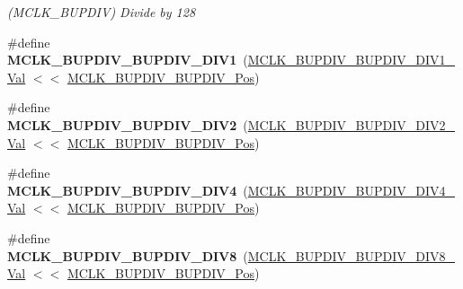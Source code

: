 \begin{DoxyCompactItemize}
\begin{DoxyCompactList}\small\item\em (M\+C\+L\+K\+\_\+\+B\+U\+P\+D\+I\+V) Divide by 128 \end{DoxyCompactList}\item 
\hypertarget{group___s_a_m_l21___m_c_l_k_ga4dd1bacc8eca76626ef8e592d1ac464b}{}\#define {\bfseries M\+C\+L\+K\+\_\+\+B\+U\+P\+D\+I\+V\+\_\+\+B\+U\+P\+D\+I\+V\+\_\+\+D\+I\+V1}~(\hyperlink{group___s_a_m_l21___m_c_l_k_ga671158df20fbfdcde67f602985780d65}{M\+C\+L\+K\+\_\+\+B\+U\+P\+D\+I\+V\+\_\+\+B\+U\+P\+D\+I\+V\+\_\+\+D\+I\+V1\+\_\+\+Val}   $<$$<$ \hyperlink{group___s_a_m_l21___m_c_l_k_ga990b49fd5adb7bbd8a9acf12cd483ae2}{M\+C\+L\+K\+\_\+\+B\+U\+P\+D\+I\+V\+\_\+\+B\+U\+P\+D\+I\+V\+\_\+\+Pos})\label{group___s_a_m_l21___m_c_l_k_ga4dd1bacc8eca76626ef8e592d1ac464b}

\item 
\hypertarget{group___s_a_m_l21___m_c_l_k_ga36a6bf67b2b1595f3bcf53fc54bceea8}{}\#define {\bfseries M\+C\+L\+K\+\_\+\+B\+U\+P\+D\+I\+V\+\_\+\+B\+U\+P\+D\+I\+V\+\_\+\+D\+I\+V2}~(\hyperlink{group___s_a_m_l21___m_c_l_k_gada1d955fec255a2fbcadeba457ae7adc}{M\+C\+L\+K\+\_\+\+B\+U\+P\+D\+I\+V\+\_\+\+B\+U\+P\+D\+I\+V\+\_\+\+D\+I\+V2\+\_\+\+Val}   $<$$<$ \hyperlink{group___s_a_m_l21___m_c_l_k_ga990b49fd5adb7bbd8a9acf12cd483ae2}{M\+C\+L\+K\+\_\+\+B\+U\+P\+D\+I\+V\+\_\+\+B\+U\+P\+D\+I\+V\+\_\+\+Pos})\label{group___s_a_m_l21___m_c_l_k_ga36a6bf67b2b1595f3bcf53fc54bceea8}

\item 
\hypertarget{group___s_a_m_l21___m_c_l_k_gae68c22231296a92c6e7aef7549c7d8fd}{}\#define {\bfseries M\+C\+L\+K\+\_\+\+B\+U\+P\+D\+I\+V\+\_\+\+B\+U\+P\+D\+I\+V\+\_\+\+D\+I\+V4}~(\hyperlink{group___s_a_m_l21___m_c_l_k_ga8d24e01f4620f7ee40ef3082ae7c0124}{M\+C\+L\+K\+\_\+\+B\+U\+P\+D\+I\+V\+\_\+\+B\+U\+P\+D\+I\+V\+\_\+\+D\+I\+V4\+\_\+\+Val}   $<$$<$ \hyperlink{group___s_a_m_l21___m_c_l_k_ga990b49fd5adb7bbd8a9acf12cd483ae2}{M\+C\+L\+K\+\_\+\+B\+U\+P\+D\+I\+V\+\_\+\+B\+U\+P\+D\+I\+V\+\_\+\+Pos})\label{group___s_a_m_l21___m_c_l_k_gae68c22231296a92c6e7aef7549c7d8fd}

\item 
\hypertarget{group___s_a_m_l21___m_c_l_k_ga0ec289ec135dca5ee500d3306ff2dc0e}{}\#define {\bfseries M\+C\+L\+K\+\_\+\+B\+U\+P\+D\+I\+V\+\_\+\+B\+U\+P\+D\+I\+V\+\_\+\+D\+I\+V8}~(\hyperlink{group___s_a_m_l21___m_c_l_k_gaf66206caec0cf262aede3e55dec93ec7}{M\+C\+L\+K\+\_\+\+B\+U\+P\+D\+I\+V\+\_\+\+B\+U\+P\+D\+I\+V\+\_\+\+D\+I\+V8\+\_\+\+Val}   $<$$<$ \hyperlink{group___s_a_m_l21___m_c_l_k_ga990b49fd5adb7bbd8a9acf12cd483ae2}{M\+C\+L\+K\+\_\+\+B\+U\+P\+D\+I\+V\+\_\+\+B\+U\+P\+D\+I\+V\+\_\+\+Pos})\label{group___s_a_m_l21___m_c_l_k_ga0ec289ec135dca5ee500d3306ff2dc0e}


\end{DoxyCompactItemize}
